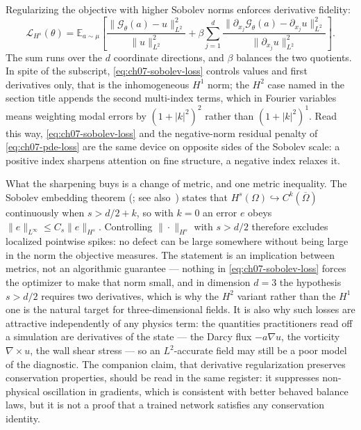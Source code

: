 Regularizing the objective with higher Sobolev norms enforces derivative fidelity:
\begin{equation}
  \label{eq:ch07-sobolev-loss}
  \mathcal{L}_{H^s}(\theta) = \mathbb{E}_{a \sim \mu} \left[ \frac{\|\mathcal{G}_\theta(a) - u\|_{L^2}^2}{\|u\|_{L^2}^2} + \beta \sum_{j=1}^d \frac{\|\partial_{x_j} \mathcal{G}_\theta(a) - \partial_{x_j} u\|_{L^2}^2}{\|\partial_{x_j} u\|_{L^2}^2} \right].
\end{equation}
The sum runs over the $d$ coordinate
directions, and $\beta$ balances the two
quotients. In spite of the subscript, \eqref{eq:ch07-sobolev-loss} controls values and first
derivatives only, that is the inhomogeneous $H^1$ norm; the $H^2$ case named in the section
title appends the second multi-index terms, which in Fourier variables means weighting modal
errors by $(1+|k|^{2})^{2}$ rather than $(1+|k|^{2})^{1}$. Read this way, \eqref{eq:ch07-sobolev-loss}
and the negative-norm residual penalty of \eqref{eq:ch07-pde-loss} are the same device on
opposite sides of the Sobolev scale: a positive
index sharpens attention on fine structure, a negative index relaxes it.

What the sharpening buys is a change
of metric, and one metric inequality. The Sobolev embedding theorem
(; see
also~\cite{evans2010partial,brezis2011functional}) states that $H^{s}(\Omega)\hookrightarrow
C^{k}(\overline{\Omega})$ continuously when $s>d/2+k$, so with $k=0$ an error $e$ obeys
$\|e\|_{L^\infty}\le C_s\|e\|_{H^{s}}$. Controlling $\|\cdot\|_{H^s}$ with $s>d/2$ therefore
excludes localized pointwise spikes: no defect can be large somewhere without being large in
the norm the objective measures. The statement is an implication between metrics, not an
algorithmic guarantee --- nothing in \eqref{eq:ch07-sobolev-loss} forces the optimizer to make
that norm small, and in dimension $d=3$ the hypothesis $s>d/2$ requires two derivatives,
which is why the $H^2$ variant rather than the $H^1$ one is the natural target for
three-dimensional fields. It is also why such losses are attractive independently of any
physics term: the quantities practitioners read off a simulation are derivatives of the
state --- the Darcy flux $-a\nabla u$, the vorticity $\nabla\times u$, the wall shear
stress --- so an $L^2$-accurate field may still be a poor model of the diagnostic. The
companion claim, that derivative regularization preserves conservation properties, should be
read in the same register: it suppresses non-physical oscillation in gradients, which is
consistent with better behaved balance laws, but it is not a proof that a trained network
satisfies any conservation identity.

